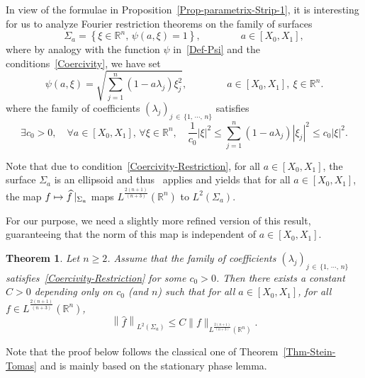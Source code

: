 \documentclass[10pt]{amsart}
\newtheorem{theo}{Theorem}[section]
\theoremstyle{definition}\newtheorem{defi}[theo]{Definition}\newtheorem{rema}[theo]{Remark}\newtheorem{exam}[theo]{Example}\newtheorem{exem}[theo]{Example}\newtheorem{nota}[theo]{Notation}
\newcommand*\R{\mathbb{R}}
\renewcommand{\leq}{\leqslant}
\renewcommand{\geq}{\geqslant}
\renewcommand{\hat}{\widehat}
\let\oldhat\hat
\renewcommand*{\hat}[1]{\mathchoice{\widehat{#1}}{\widehat{#1}}{\oldhat{#1}}{\oldhat{#1}}}
\let\oldexists\exists
\renewcommand*{\exists}{\mathrel{\oldexists}}
\let\oldforall\forall
\renewcommand*{\forall}{\mathrel{\oldforall}}
\begin{document}
In view of the formulae in Proposition~\ref{Prop-parametrix-Strip-1}, it is interesting for us to analyze Fourier restriction theorems on the family of surfaces
\begin{equation}\label{Def-Sigma-a}
\Sigma_{a} = \left\{ \xi \in \R^n, \, \psi(a, \xi) = 1\right\}, \qquad \qquad a \in [X_0, X_1],
\end{equation}
where by analogy with the function $\psi$ in~\eqref{Def-Psi} and the conditions~\eqref{Coercivity}, we have set
\begin{equation}\label{Def-Psi-R-n}
\psi(a, \xi)=\sqrt{ \sum_{j=1}^{n}(1-a \lambda_{j}) \xi_{j} ^2},
\qquad \qquad a \in [X_0,X_1], \ \xi \in \R^{n}.
\end{equation}
where the family of coefficients $(\lambda_j)_{j\, \in\,\{1,\,\cdots,\,n\}}$ satisfies
\begin{equation}\label{Coercivity-Restriction}
\exists c_0 >0, \quad \forall a \in [X_0, X_1], \, \forall \xi \in \R^{n}, \quad
\frac{1}{c_0} | \xi|^2
\leq
\sum_{j =1}^n \left(1 - a \lambda_j\right) \left|\xi_j\right|^2
\leq c_0 |\xi|^2.
\end{equation}

Note that due to condition~\eqref{Coercivity-Restriction}, for all $a\in [X_0, X_1]$, the surface $\Sigma_{a}$ is an ellipsoid and thus~\cite[Corollary~2.2.2]{sogge2017fourier} applies and yields that for all $a \in [X_0, X_1]$, the map $f \mapsto \hat f\,|_{\Sigma_{a}} $ maps $L^{\frac{2(n+1)}{(n+3)}} (\R^n)$ to $L^2(\Sigma_{a})$.

For our purpose, we need a slightly more refined version of this result, guaranteeing that the norm of this map is independent of $a \in [X_0, X_1]$.
\begin{theo}\label{Thm-Fourier-Rest-Sigma-x-1}
Let $n \geq 2$. Assume that the family of coefficients $(\lambda_j)_{j\, \in\,\{1,\, \cdots,\,n\}}$ satisfies~\eqref{Coercivity-Restriction} for some $c_0 >0$. Then there exists a constant $C>0$ depending only on $c_0$ (and $n$) such that for all $a \in [X_0, X_1]$, for all $f \in L^{\frac{2(n+1)}{(n+3)}}(\R^n)$,
\begin{equation}\label{Uniform-Restriction-Thm}
\left\| \widehat f\right \|_{L^2(\Sigma_{a})} \leqslant C \|f\|_{L^{\frac{2(n+1)}{(n+3)}}\left(\R^n\right)}.
\end{equation}
\end{theo}

Note that the proof below follows the classical one of Theorem~\ref{Thm-Stein-Tomas} and is mainly based on the stationary phase lemma.
\end{document}
